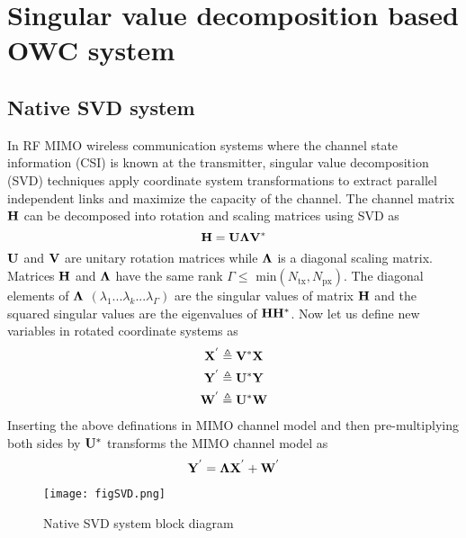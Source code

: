 \section{Singular value decomposition based OWC system}
\label{sec:svdvlc}
\graphicspath{{_System/figures_svdvlc/}}

\subsection{Native SVD system}
\label{subsec:svdvlcNative}
In RF MIMO wireless communication systems where the channel state information (CSI) is known at the transmitter, singular value decomposition (SVD) techniques apply coordinate system transformations to extract parallel independent links and maximize the capacity of the channel. The channel matrix $\bf{H}$ can be decomposed into rotation and scaling matrices using SVD as 
\begin{equation}
	\label{eqHsvd}
	\bf{H} = \bf{U}\bf{\Lambda}\bf{V}^{*}
\end{equation}
$\bf{U}$ and $\bf{V}$ are unitary rotation matrices while $\bf{\Lambda}$ is a diagonal scaling matrix. Matrices $\bf{H}$ and $\bf{\Lambda}$ have the same rank $\Gamma\leq$ min$(N_{\text{tx}},N_{\text{px}})$. The diagonal elements of $\bf{\Lambda}$ $(\lambda_{1}...\lambda_{k}...\lambda_{\Gamma})$ are the singular values of matrix $\bf{H}$ and the squared singular values are the eigenvalues of ${\bf{H}}{\bf{H}}^{*}$. Now let us define new variables in rotated coordinate systems as
\begin{gather}
	\bf{X}^{'} \triangleq \bf{V}^{*}\bf{X}\\
	\bf{Y}^{'} \triangleq \bf{U}^{*}\bf{Y}\\
	\bf{W}^{'} \triangleq \bf{U}^{*}\bf{W}
\end{gather}
Inserting the above definations in MIMO channel model and then pre-multiplying both sides by $\bf{U}^{*}$ transforms the MIMO channel model as
\begin{equation}
	\label{eqSVDChannel}
	\bf{Y}^{'} = \bf{\Lambda}\bf{X}^{'} + \bf{W}^{'}
\end{equation}

\begin{figure}[!t]
	\centering
		\texttt{[image: figSVD.png]}
	\caption[Native SVD dystem block diagram]{Native SVD system block diagram}
	\label{fig:SVD}
\end{figure}

